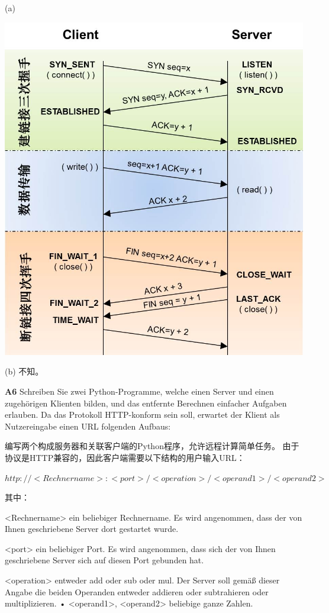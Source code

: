 \documentclass[fleqn]{article}
\begin{document}
(a) 
\begin{center}
    \includegraphics[scale=0.6]{bild7.jpg}
\end{center}

(b) 不知。

\noindent\textbf{A6} Schreiben Sie zwei Python-Programme, welche einen Server und einen zugehörigen Klienten bilden, und das entfernte Berechnen einfacher Aufgaben erlauben.
Da das Protokoll HTTP-konform sein soll, erwartet der Klient als Nutzereingabe einen URL folgenden Aufbaus:

编写两个构成服务器和关联客户端的Python程序，允许远程计算简单任务。
由于协议是HTTP兼容的，因此客户端需要以下结构的用户输入URL：

$http://<Rechnername>:<port>/<operation>/<operand1 >/<operand2 >$

其中：

<Rechnername> ein beliebiger Rechnername. Es wird angenommen, dass der von Ihnen geschriebene Server dort gestartet wurde.

<port> ein beliebiger Port. Es wird angenommen, dass sich der von Ihnen geschriebene Server sich auf diesen Port gebunden hat.

<operation> entweder add oder sub oder mul. Der Server soll gemäß dieser Angabe die beiden Operanden entweder addieren oder subtrahieren oder multiplizieren. • <operand1>, <operand2> beliebige ganze Zahlen.
\end{document}
